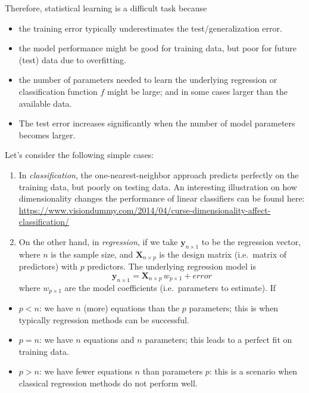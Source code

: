 \documentclass[
]{book}
\begin{document}
Therefore, statistical learning is a difficult task because

\begin{itemize}
\item
  the training error typically underestimates the test/generalization error.
\item
  the model performance might be good for training data, but poor for future (test) data due to overfitting.
\item
  the number of parameters needed to learn the underlying regression or classification function \(f\) might be large; and in some cases larger than the available data.
\item
  The test error increases significantly when the number of model parameters becomes larger.
\end{itemize}

Let's consider the following simple cases:

\begin{enumerate}
\def\labelenumi{(\arabic{enumi})}
\item
  In \emph{classification}, the one-nearest-neighbor approach predicts perfectly on the training data, but poorly on testing data. An interesting illustration on how dimensionality changes the performance of linear classifiers can be found here: \url{https://www.visiondummy.com/2014/04/curse-dimensionality-affect-classification/}
\item
  On the other hand, in \emph{regression}, if we take \(\mathbf{y}_{n\times 1}\) to be the regression vector, where \(n\) is the sample size, and \(\mathbf{X}_{n\times p}\) is the design matrix (i.e.~matrix of predictors) with \(p\) predictors. The underlying regression model is
  \[\mathbf{y}_{n\times 1} = \mathbf{X}_{n\times p} \, w_{p\times 1} + error\]
  where \(w_{p\times 1}\) are the model coefficients (i.e.~parameters to estimate). If
\end{enumerate}

\begin{itemize}
\item
  \(p<n\): we have \(n\) (more) equations than the \(p\) parameters; this is when typically regression methods can be successful.
\item
  \(p=n\): we have \(n\) equations and \(n\) parameters; this leads to a perfect fit on training data.
\item
  \(p>n\): we have fewer equations \(n\) than parameters \(p\): this is a scenario when classical regression methods do not perform well.
\end{itemize}
\end{document}
